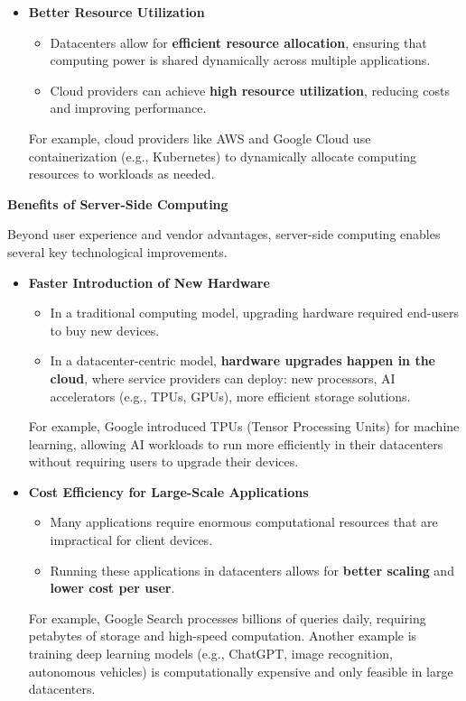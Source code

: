 \begin{itemize}
    \item \textcolor{Green3}{\textbf{Better Resource Utilization}}
    \begin{itemize}
        \item[\textcolor{Green3}{\faIcon{check}}] Datacenters allow for \textbf{efficient resource allocation}, ensuring that computing power is shared dynamically across multiple applications.
        \item[\textcolor{Green3}{\faIcon{check}}] Cloud providers can achieve \textbf{high resource utilization}, reducing costs and improving performance.
    \end{itemize}
    For example, cloud providers like AWS and Google Cloud use containerization (e.g., Kubernetes) to dynamically allocate computing resources to workloads as needed.
\end{itemize}

\newpage

\begin{flushleft}
    \textcolor{Green3}{ \textbf{Benefits of Server-Side Computing}}
\end{flushleft}
Beyond user experience and vendor advantages, server-side computing enables several key technological improvements.
\begin{itemize}
    \item \textcolor{Green3}{\textbf{Faster Introduction of New Hardware}}
    \begin{itemize}
        \item[\textcolor{Red2}{\faIcon{times}}] In a traditional computing model, upgrading hardware required end-users to buy new devices.
        \item[\textcolor{Green3}{\faIcon{check}}] In a datacenter-centric model, \textbf{hardware upgrades happen in the cloud}, where service providers can deploy: new processors, AI accelerators (e.g., TPUs, GPUs), more efficient storage solutions.
    \end{itemize}
    For example, Google introduced TPUs (Tensor Processing Units) for machine learning, allowing AI workloads to run more efficiently in their datacenters without requiring users to upgrade their devices.

    \item \textcolor{Green3}{\textbf{Cost Efficiency for Large-Scale Applications}}
    \begin{itemize}
        \item[\textcolor{Red2}{\faIcon{times}}] Many applications require enormous computational resources that are impractical for client devices.
        \item[\textcolor{Green3}{\faIcon{check}}] Running these applications in datacenters allows for \textbf{better scaling} and \textbf{lower cost per user}.
    \end{itemize}
    For example, Google Search processes billions of queries daily, requiring petabytes of storage and high-speed computation. Another example is training deep learning models (e.g., ChatGPT, image recognition, autonomous vehicles) is computationally expensive and only feasible in large datacenters.
\end{itemize}

